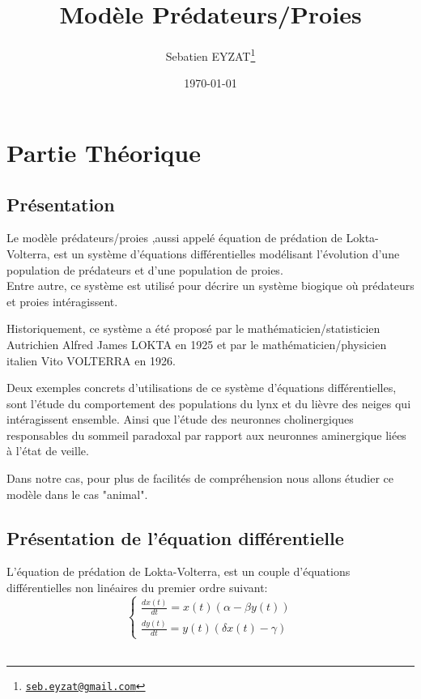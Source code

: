 \documentclass[a4paper,16pt,twoside]{report}
\title{Modèle Prédateurs/Proies}
\date{\today}
\author{Sebatien EYZAT\thanks{\href{seb.eyzat@gmail.com}{\tt seb.eyzat@gmail.com}}
}
\begin{document}
\maketitle

\cleardoublepage
\tableofcontents

\chapter{Partie Théorique}
\section{Présentation}
Le modèle prédateurs/proies ,aussi appelé équation de prédation de Lokta-Volterra, est un système d'équations différentielles modélisant l'évolution d'une population de prédateurs et d'une population de proies.\\
Entre autre, ce système est utilisé pour décrire un système biogique où prédateurs et proies intéragissent.


Historiquement, ce système a été proposé par le mathématicien/statisticien Autrichien Alfred James LOKTA en 1925 et par le mathématicien/physicien italien Vito VOLTERRA en 1926.


Deux exemples concrets d'utilisations de ce système d'équations différentielles, sont l'étude du comportement des populations du lynx et du lièvre des neiges qui intéragissent ensemble. Ainsi que l'étude des neuronnes cholinergiques responsables du sommeil paradoxal par rapport aux neuronnes aminergique liées à l'état de veille.


Dans notre cas, pour plus de facilités de compréhension nous allons étudier ce modèle dans le cas "animal".
\section{Présentation de l'équation différentielle}
L'équation de prédation de Lokta-Volterra, est un couple d'équations différentielles non linéaires du premier ordre suivant:\\
\begin{equation}
   \left\{
    \begin{array}{rcr}
    \frac{dx(t)}{dt}=x(t)(\alpha - \beta y(t))\\
    \frac{dy(t)}{dt}=y(t)(\delta x(t)- \gamma)
    \end{array}
		\right.
\end{equation}\\
\end{document}
